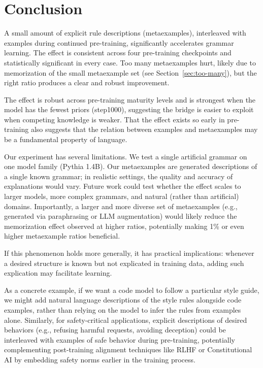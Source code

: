 \documentclass[11pt]{article}
\begin{document}
\section{Conclusion}

A small amount of explicit rule descriptions (metaexamples), interleaved with examples during continued pre-training, significantly accelerates grammar learning. The effect is consistent across four pre-training checkpoints and statistically significant in every case. Too many metaexamples hurt, likely due to memorization of the small metaexample set (see Section~\ref{sec:too-many}), but the right ratio produces a clear and robust improvement.

The effect is robust across pre-training maturity levels and is strongest when the model has the fewest priors (step1000), suggesting the bridge is easier to exploit when competing knowledge is weaker. That the effect exists so early in pre-training also suggests that the relation between examples and metaexamples may be a fundamental property of language.

Our experiment has several limitations. We test a single artificial grammar on one model family (Pythia 1.4B). Our metaexamples are generated descriptions of a single known grammar; in realistic settings, the quality and accuracy of explanations would vary. Future work could test whether the effect scales to larger models, more complex grammars, and natural (rather than artificial) domains. Importantly, a larger and more diverse set of metaexamples (e.g., generated via paraphrasing or LLM augmentation) would likely reduce the memorization effect observed at higher ratios, potentially making 1\% or even higher metaexample ratios beneficial.

If this phenomenon holds more generally, it has practical implications: whenever a desired structure is known but not explicated in training data, adding such explication may facilitate learning.

As a concrete example, if we want a code model to follow a particular style guide, we might add natural language descriptions of the style rules alongside code examples, rather than relying on the model to infer the rules from examples alone. Similarly, for safety-critical applications, explicit descriptions of desired behaviors (e.g., refusing harmful requests, avoiding deception) could be interleaved with examples of safe behavior during pre-training, potentially complementing post-training alignment techniques like RLHF \cite{ouyang2022} or Constitutional AI \cite{bai2022} by embedding safety norms earlier in the training process.
\end{document}
